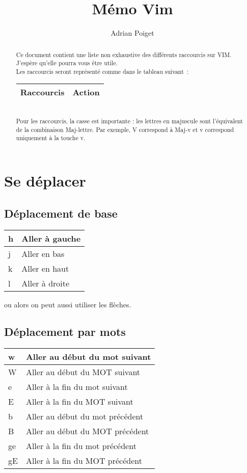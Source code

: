 \documentclass{article}
\title{Mémo Vim}
\author{Adrian Poiget}
\begin{document}
\maketitle
\begin{abstract}
Ce document contient une liste non exhaustive des différents raccourcis sur VIM.
J'espère qu'elle pourra vous être utile.\\
Les raccourcis seront représenté comme dans le tableau suivant~:
\begin{tabular}{|p{3cm}| l| }
\hline
Raccourcis & Action\\ \hline
\end{tabular}\\
Pour les raccourcis, la casse est importante : les lettres en majuscule sont l'équivalent de la combinaison Maj-lettre. Par exemple, V correspond à Maj-v et v correspond uniquement à la touche v.
\end{abstract}

\tableofcontents
\newpage

\section{Se déplacer}
\subsection{Déplacement de base}
\begin{tabular}{|p{3cm}| l| }
\hline
h & Aller à gauche \\ \hline
j & Aller en bas \\ \hline
k & Aller en haut \\ \hline
l & Aller à droite \\ \hline
\end{tabular}
ou alors on peut aussi utiliser les flèches.

\subsection{Déplacement par mots}
\begin{tabular}{|p{3cm}| l| }
\hline
w & Aller au début du mot suivant\\ \hline
W & Aller au début du MOT suivant\\ \hline
e & Aller à la fin du mot suivant\\ \hline
E & Aller à la fin du MOT suivant\\ \hline
b & Aller au début du mot précédent\\ \hline
B & Aller au début du MOT précédent\\ \hline
    ge & Aller à la fin du mot précédent\\ \hline
gE & Aller à la fin du MOT précédent\\ \hline
\end{tabular}\\
\end{document}
